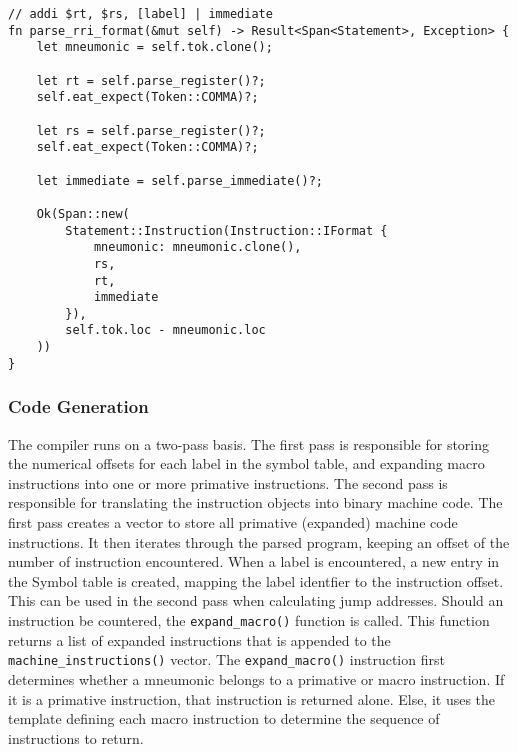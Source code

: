 \begin{lstlisting}
// addi $rt, $rs, [label] | immediate
fn parse_rri_format(&mut self) -> Result<Span<Statement>, Exception> {
    let mneumonic = self.tok.clone();

    let rt = self.parse_register()?;
    self.eat_expect(Token::COMMA)?;

    let rs = self.parse_register()?;
    self.eat_expect(Token::COMMA)?;

    let immediate = self.parse_immediate()?;

    Ok(Span::new(
        Statement::Instruction(Instruction::IFormat { 
            mneumonic: mneumonic.clone(), 
            rs, 
            rt, 
            immediate 
        }),
        self.tok.loc - mneumonic.loc
    ))
}
\end{lstlisting}

\subsubsection{Code Generation}
The compiler runs on a two-pass basis. The first pass is responsible for storing the numerical offsets for each label in the symbol table, and expanding macro instructions into one or more primative instructions. The second pass is responsible for translating the instruction objects into binary machine code. The first pass creates a vector to store all primative (expanded) machine code instructions. It then iterates through the parsed program, keeping an offset of the number of instruction encountered. When a label is encountered, a new entry in the Symbol table is created, mapping the label identfier to the instruction offset. This can be used in the second pass when calculating jump addresses. Should an instruction be countered, the \texttt{expand\_macro()} function is called. This function returns a list of expanded instructions that is appended to the \texttt{machine\_instructions()} vector. The \texttt{expand\_macro()} instruction first determines whether a mneumonic belongs to a primative or macro instruction. If it is a primative instruction, that instruction is returned alone. Else, it uses the template defining each macro instruction to determine the sequence of instructions to return.

